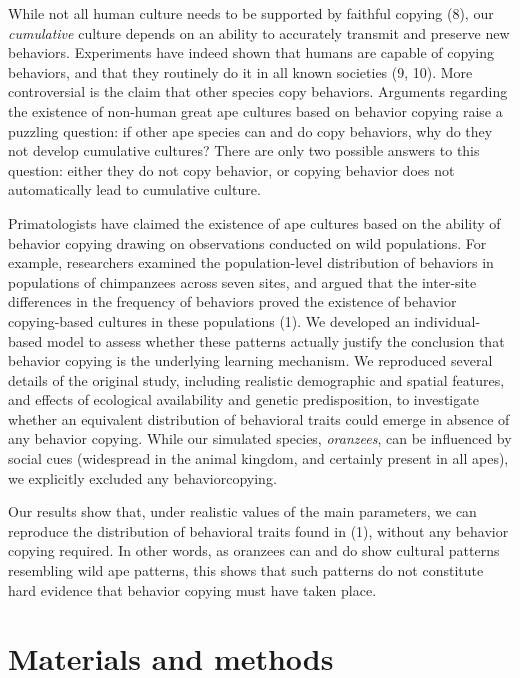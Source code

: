 \documentclass[9pt,twocolumn,twoside,]{pnas-new}
\begin{document}
While not all human culture needs to be supported by faithful copying
(8), our \emph{cumulative} culture depends on an ability to accurately
transmit and preserve new behaviors. Experiments have indeed shown that
humans are capable of copying behaviors, and that they routinely do it
in all known societies (9, 10). More controversial is the claim that
other species copy behaviors. Arguments regarding the existence of
non-human great ape cultures based on behavior copying raise a puzzling
question: if other ape species can and do copy behaviors, why do they
not develop cumulative cultures? There are only two possible answers to
this question: either they do not copy behavior, or copying behavior
does not automatically lead to cumulative culture.

Primatologists have claimed the existence of ape cultures based on the
ability of behavior copying drawing on observations conducted on wild
populations. For example, researchers examined the population-level
distribution of behaviors in populations of chimpanzees across seven
sites, and argued that the inter-site differences in the frequency of
behaviors proved the existence of behavior copying-based cultures in
these populations (1). We developed an individual-based model to assess
whether these patterns actually justify the conclusion that behavior
copying is the underlying learning mechanism. We reproduced several
details of the original study, including realistic demographic and
spatial features, and effects of ecological availability and genetic
predisposition, to investigate whether an equivalent distribution of
behavioral traits could emerge in absence of any behavior copying. While
our simulated species, \emph{oranzees}, can be influenced by social cues
(widespread in the animal kingdom, and certainly present in all apes),
we explicitly excluded any behaviorcopying.

Our results show that, under realistic values of the main parameters, we
can reproduce the distribution of behavioral traits found in (1),
without any behavior copying required. In other words, as oranzees can
and do show cultural patterns resembling wild ape patterns, this shows
that such patterns do not constitute hard evidence that behavior copying
must have taken place.

\section*{Materials and methods}\label{materials-and-methods}
\end{document}
